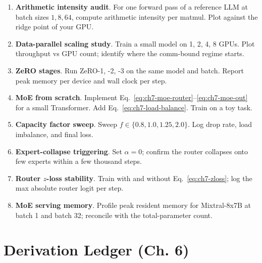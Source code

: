 \begin{enumerate}
  \item \textbf{Arithmetic intensity audit}. For one forward pass of
        a reference LLM at batch sizes $1, 8, 64$, compute
        arithmetic intensity per matmul. Plot against the ridge
        point of your GPU.
  \item \textbf{Data-parallel scaling study}. Train a small model on
        1, 2, 4, 8 GPUs. Plot throughput vs GPU count; identify
        where the comm-bound regime starts.
  \item \textbf{ZeRO stages}. Run ZeRO-1, -2, -3 on the same model
        and batch. Report peak memory per device and wall clock per
        step.
  \item \textbf{MoE from scratch}. Implement Eq.\
        \eqref{eq:ch7-moe-router}--\eqref{eq:ch7-moe-out} for a
        small Transformer. Add Eq.\ \eqref{eq:ch7-load-balance}.
        Train on a toy task.
  \item \textbf{Capacity factor sweep}. Sweep $f \in \{0.8, 1.0,
        1.25, 2.0\}$. Log drop rate, load imbalance, and final loss.
  \item \textbf{Expert-collapse triggering}. Set $\alpha = 0$;
        confirm the router collapses onto few experts within a few
        thousand steps.
  \item \textbf{Router $z$-loss stability}. Train with and without
        Eq.\ \eqref{eq:ch7-zloss}; log the max absolute router
        logit per step.
  \item \textbf{MoE serving memory}. Profile peak resident memory
        for Mixtral-8x7B at batch 1 and batch 32; reconcile with the
        total-parameter count.
\end{enumerate}

\section*{Derivation Ledger (Ch. 6)}


